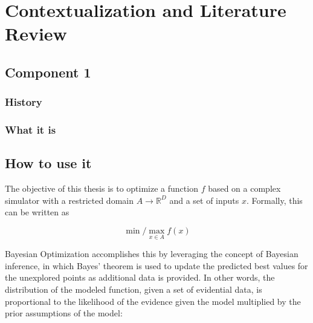 


\chapter[Contextualization and Literature Review]{Contextualization and Literature Review}


\section{Component 1}
\subsection{History}
\subsection{What it is}
\section{How to use it}

The objective of this thesis is to optimize a function $f$ based on a complex simulator with a restricted domain $A \to \mathbb{R}^D$ and a set of inputs $x$. Formally, this can be written as

\begin{equation}
\min/\max_{x \in A} f(x)
\end{equation}

Bayesian Optimization accomplishes this by leveraging the concept of Bayesian inference, in which Bayes' theorem is used to update the predicted best values for the unexplored points as additional data is provided. In other words, the distribution of the modeled function, given a set of evidential data, is proportional to the likelihood of the evidence given the model multiplied by the prior assumptions of the model:

